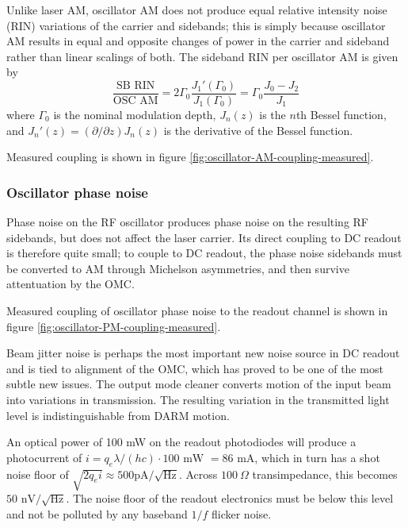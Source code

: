 Unlike laser AM, oscillator AM does not produce equal relative intensity noise
(RIN) variations of the carrier and sidebands; this is simply because oscillator
AM results in equal and opposite changes of power in the carrier and sideband
rather than linear scalings of both.  The sideband RIN per oscillator AM is
given by
\begin{equation}
\frac{\text{SB RIN}}{\text{OSC AM}}=2\Gamma_{0}\frac{J_{1}'(\Gamma_{0})}{J_{1}(\Gamma_{0})}=\Gamma_{0}\frac{J_{0}-J_{2}}{J_{1}}
\end{equation}
where $\Gamma_0$ is the nominal modulation depth, $J_n(z)$ is the $n$th Bessel
function, and $J_n'(z)=(\partial/\partial z)J_n(z)$ is the derivative of the Bessel function.

Measured coupling is shown in figure \ref{fig:oscillator-AM-coupling-measured}.

\subsubsection{Oscillator phase noise}

Phase noise on the RF oscillator produces phase noise on the resulting RF
sidebands, but does not affect the laser carrier.  Its direct coupling to DC
readout is therefore quite small; to couple to DC readout, the phase noise
sidebands must be converted to AM through Michelson asymmetries, and then
survive attentuation by the OMC.

Measured coupling of oscillator phase noise to the readout channel
is shown in figure \ref{fig:oscillator-PM-coupling-measured}.

%
Beam jitter noise is perhaps the most important new noise source in
DC readout and is tied to alignment of the OMC, which has proved to
be one of the most subtle new issues. The output mode cleaner converts
motion of the input beam into variations in transmission. The resulting
variation in the transmitted light level is indistinguishable from
DARM motion.



%
An optical power of 100 mW on the readout photodiodes will produce a
photocurrent of $i = q_e\lambda/(hc)\cdot 100\text{ mW } = 86\text{ mA}$, which
in turn has a shot noise floor of $\sqrt{2 q_e i}\approx 500 \text{
  pA}/\sqrt{\text{Hz}}$.  Across $100\ \Omega$ transimpedance, this becomes $50
\text{ nV}/\sqrt{\text{Hz}}$.  The noise floor of the readout electronics must
be below this level and not be polluted by any baseband $1/f$ flicker noise.

